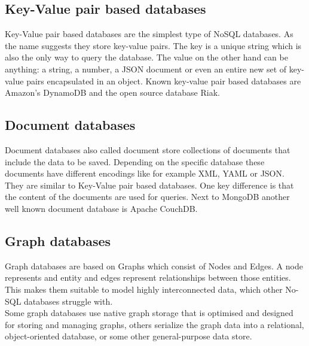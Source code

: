 \documentclass[11pt]{article}
\begin{document}
\subsection{Key-Value pair based databases}
Key-Value pair based databases are the simplest type of NoSQL databases. 
As the name suggests they store key-value pairs. 
The key is a unique string which is also the only way to query the database.\cite{kvquery} 
The value on the other hand can be anything: a string, a number, a JSON document or even an entire new set of key-value pairs encapsulated in an object. 
Known key-value pair based databases are Amazon's DynamoDB and the open source database Riak. 
\subsection{Document databases}
Document databases also called document store collections of documents that include the data to be saved. 
Depending on the specific database these documents have different encodings like for example XML, YAML or JSON. 
They are similar to Key-Value pair based databases. 
One key difference is that the content of the documents are used for queries. 
Next to MongoDB another well known document database is Apache CouchDB.

\subsection{Graph databases}
Graph databases are based on Graphs which consist of Nodes and Edges. A node represents and entity and edges represent relationships between those entities. This makes them suitable to model highly interconnected data, which other No-SQL databases struggle with. \\
Some graph databases use native graph storage that is optimised and designed for storing and managing graphs, others serialize the graph data into a relational, object-oriented database, or some other general-purpose data store. \cite{graph_storage}
\end{document}
